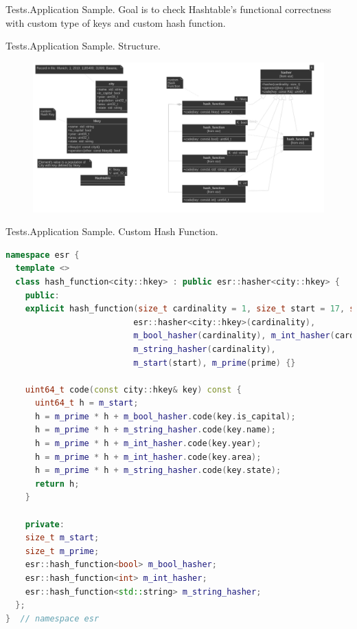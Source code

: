 \documentclass{beamer}
\begin{document}
\begin{frame}{Tests.}{Application Sample.}
  Goal is to check Hashtable's functional correctness with custom type of keys and custom hash function.   
\end{frame}

\begin{frame}{Tests.}{Application Sample. Structure.}
  \begin{figure}
    \includegraphics[scale=0.3]{pictures/structure_city_classes}
  \end{figure}
\end{frame}

\begin{frame}[fragile]{Tests.}{Application Sample. Custom Hash Function.}
\begin{lstlisting}[language=C++,basicstyle=\ttfamily\tiny,keywordstyle=\color{red}]
namespace esr {
  template <>
  class hash_function<city::hkey> : public esr::hasher<city::hkey> {
    public:
    explicit hash_function(size_t cardinality = 1, size_t start = 17, size_t prime = 31) :
                          esr::hasher<city::hkey>(cardinality),
                          m_bool_hasher(cardinality), m_int_hasher(cardinality),
                          m_string_hasher(cardinality),
                          m_start(start), m_prime(prime) {}

    uint64_t code(const city::hkey& key) const {
      uint64_t h = m_start;
      h = m_prime * h + m_bool_hasher.code(key.is_capital);
      h = m_prime * h + m_string_hasher.code(key.name);
      h = m_prime * h + m_int_hasher.code(key.year);
      h = m_prime * h + m_int_hasher.code(key.area);
      h = m_prime * h + m_string_hasher.code(key.state);
      return h;
    }

    private:
    size_t m_start;
    size_t m_prime;
    esr::hash_function<bool> m_bool_hasher;
    esr::hash_function<int> m_int_hasher;
    esr::hash_function<std::string> m_string_hasher;
  };
}  // namespace esr
\end{lstlisting}

\end{frame}
\end{document}
